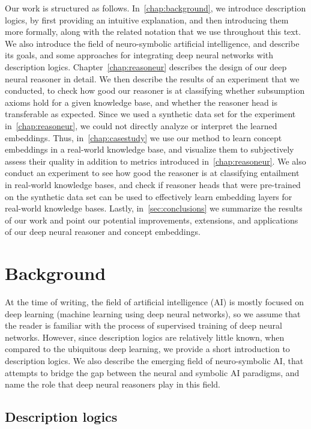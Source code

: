 Our work is structured as follows.
In~\autoref{chap:background}, we introduce description logics, by first providing an intuitive explanation, and then introducing them more formally, along with the related notation that we use throughout this text.
We also introduce the field of neuro-symbolic artificial intelligence, and describe its goals, and some approaches for integrating deep neural networks with description logics.
Chapter~\ref{chap:reasoneur} describes the design of our deep neural reasoner in detail.
We then describe the results of an experiment that we conducted, to check how good our reasoner is at classifying whether subsumption axioms hold for a given knowledge base, and whether the reasoner head is transferable as expected.
Since we used a synthetic data set for the experiment in~\autoref{chap:reasoneur}, we could not directly analyze or interpret the learned embeddings.
Thus, in~\autoref{chap:casestudy} we use our method to learn concept embeddings in a real-world knowledge base, and visualize them to subjectively assess their quality in addition to metrics introduced in~\autoref{chap:reasoneur}.
We also conduct an experiment to see how good the reasoner is at classifying entailment in real-world knowledge bases, and check if reasoner heads that were pre-trained on the synthetic data set can be used to effectively learn embedding layers for real-world knowledge bases.
Lastly, in~\autoref{sec:conclusions} we summarize the results of our work and point our potential improvements, extensions, and applications of our deep neural reasoner and concept embeddings.

\chapter{Background}
\label{chap:background}

At the time of writing, the field of artificial intelligence (AI) is mostly focused on deep learning (machine learning using deep neural networks), so we assume that the reader is familiar with the process of supervised training of deep neural networks.
However, since description logics are relatively little known, when compared to the ubiquitous deep learning, we provide a short introduction to description logics.
We also describe the emerging field of neuro-symbolic AI, that attempts to bridge the gap between the neural and symbolic AI paradigms, and name the role that deep neural reasoners play in this field.

\section{Description logics}
\label{sec:intro-dl}

